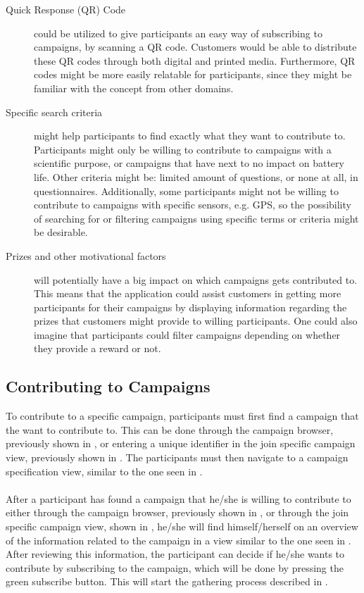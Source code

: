 \begin{description}
    \item[Quick Response (QR) Code] could be utilized to give participants an easy way of subscribing to campaigns, by scanning a QR code. Customers would be able to distribute these QR codes through both digital and printed media. Furthermore, QR codes might be more easily relatable for participants, since they might be familiar with the concept from other domains.

    \item[Specific search criteria] might help participants to find exactly what they want to contribute to. Participants might only be willing to contribute to campaigns with a scientific purpose, or campaigns that have next to no impact on battery life. Other criteria might be: limited amount of questions, or none at all, in questionnaires. Additionally, some participants might not be willing to contribute to campaigns with specific sensors, e.g. GPS, so the possibility of searching for or filtering campaigns using specific terms or criteria might be desirable.

    \item[Prizes and other motivational factors] will potentially have a big impact on which campaigns gets contributed to. This means that the application could assist customers in getting more participants for their campaigns by displaying information regarding the prizes that customers might provide to willing participants. One could also imagine that participants could filter campaigns depending on whether they provide a reward or not.
\end{description} 

\subsection{Contributing to Campaigns}
\label{sub:contributing_to_campaigns}

To contribute to a specific campaign, participants must first find a campaign that the want to contribute to. This can be done through the campaign browser, previously shown in , or entering a unique identifier in the join specific campaign view, previously shown in . The participants must then navigate to a campaign specification view, similar to the one seen in . 
\\\\
After a participant has found a campaign that he/she is willing to contribute to either through the campaign browser, previously shown in , or through the join specific campaign view, shown in , he/she will find himself/herself on an overview of the information related to the campaign in a view similar to the one seen in . After reviewing this information, the participant can decide if he/she wants to contribute by subscribing to the campaign, which will be done by pressing the green subscribe button. This will start the gathering process described in .

